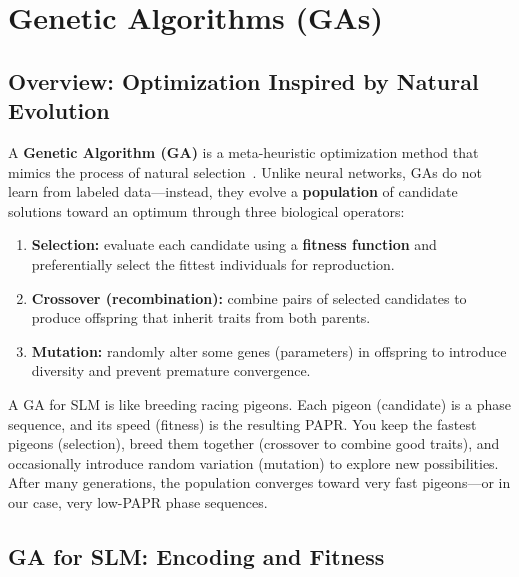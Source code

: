 \section{Genetic Algorithms (GAs)}
\label{sec:genetic_algorithms}

\subsection{Overview: Optimization Inspired by Natural Evolution}

A \textbf{Genetic Algorithm (GA)} is a meta-heuristic optimization method
that mimics the process of natural selection~\cite{ali2016new}.
Unlike neural networks, GAs do not learn from labeled data---instead,
they evolve a \textbf{population} of candidate solutions toward
an optimum through three biological operators:

\begin{enumerate}
    \item \textbf{Selection:} evaluate each candidate using a
          \textbf{fitness function} and preferentially select the
          fittest individuals for reproduction.
    \item \textbf{Crossover (recombination):} combine pairs of selected
          candidates to produce offspring that inherit traits from
          both parents.
    \item \textbf{Mutation:} randomly alter some genes (parameters)
          in offspring to introduce diversity and prevent premature
          convergence.
\end{enumerate}

\begin{workingexample}
    A GA for SLM is like breeding racing pigeons.  Each pigeon (candidate)
    is a phase sequence, and its speed (fitness) is the resulting PAPR.
    You keep the fastest pigeons (selection), breed them together
    (crossover to combine good traits), and occasionally introduce
    random variation (mutation) to explore new possibilities.
    After many generations, the population converges toward very fast
    pigeons---or in our case, very low-PAPR phase sequences.
\end{workingexample}

\subsection{GA for SLM: Encoding and Fitness}

